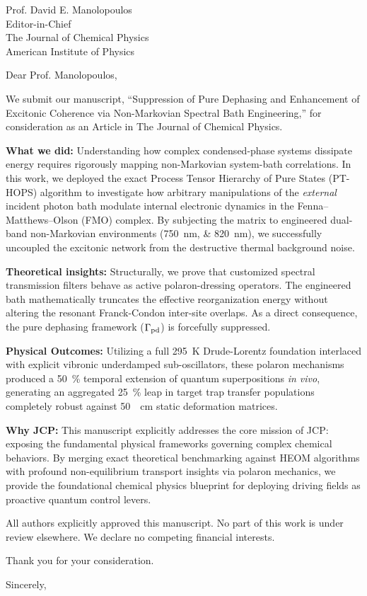 \documentclass[11pt,a4paper]{letter}
\begin{document}
\begin{letter}{
Prof. David E. Manolopoulos\\
Editor-in-Chief\\
The Journal of Chemical Physics\\
American Institute of Physics
}

\opening{Dear Prof. Manolopoulos,}

We submit our manuscript, ``Suppression of Pure Dephasing and Enhancement of Excitonic Coherence via Non-Markovian Spectral Bath Engineering,'' for consideration as an Article in The Journal of Chemical Physics.

\textbf{What we did:} Understanding how complex condensed-phase systems dissipate energy requires rigorously mapping non-Markovian system-bath correlations. In this work, we deployed the exact Process Tensor Hierarchy of Pure States (PT-HOPS) algorithm to investigate how arbitrary manipulations of the \textit{external} incident photon bath modulate internal electronic dynamics in the Fenna--Matthews--Olson (FMO) complex. By subjecting the matrix to engineered dual-band non-Markovian environments (\SIlist{750;820}{\nano\meter}), we successfully uncoupled the excitonic network from the destructive thermal background noise. 

\textbf{Theoretical insights:} Structurally, we prove that customized spectral transmission filters behave as active polaron-dressing operators. The engineered bath mathematically truncates the effective reorganization energy without altering the resonant Franck-Condon inter-site overlaps. As a direct consequence, the pure dephasing framework ($\Gamma_{\rm pd}$) is forcefully suppressed. 

\textbf{Physical Outcomes:} Utilizing a full \SI{295}{\kelvin} Drude-Lorentz foundation interlaced with explicit vibronic underdamped sub-oscillators, these polaron mechanisms produced a \SI{50}{\percent} temporal extension of quantum superpositions \textit{in vivo}, generating an aggregated \SI{25}{\percent} leap in target trap transfer populations completely robust against \SI{50}{\per\centi\meter} static deformation matrices. 

\textbf{Why JCP:} This manuscript explicitly addresses the core mission of JCP: exposing the fundamental physical frameworks governing complex chemical behaviors. By merging exact theoretical benchmarking against HEOM algorithms with profound non-equilibrium transport insights via polaron mechanics, we provide the foundational chemical physics blueprint for deploying driving fields as proactive quantum control levers.

All authors explicitly approved this manuscript. No part of this work is under review elsewhere. We declare no competing financial interests.

Thank you for your consideration.

\closing{Sincerely,}


\end{letter}
\end{document}
